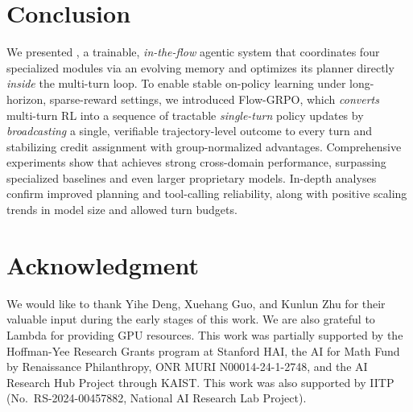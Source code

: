 \vspace{-2mm}
\section{Conclusion}
\vspace{-1mm}


We presented \model, a trainable, \emph{in-the-flow} agentic system that coordinates four specialized modules via an evolving memory and optimizes its planner directly \emph{inside} the multi-turn loop. To enable stable on-policy learning under long-horizon, sparse-reward settings, we introduced Flow-GRPO, which \emph{converts} multi-turn RL into a sequence of tractable \emph{single-turn} policy updates by \emph{broadcasting} a single, verifiable trajectory-level outcome to every turn and stabilizing credit assignment with group-normalized advantages. Comprehensive experiments show that \model achieves strong cross-domain performance, surpassing specialized baselines and even larger proprietary models. In-depth analyses confirm improved planning and tool-calling reliability, along with positive scaling trends in model size and allowed turn budgets.

\section*{Acknowledgment}
We would like to thank Yihe Deng, Xuehang Guo, and Kunlun Zhu for their valuable input during the early stages of this work. We are also grateful to Lambda for providing GPU resources. This work was partially supported by the Hoffman-Yee Research Grants program at Stanford HAI, the AI for Math Fund by Renaissance Philanthropy, ONR MURI N00014-24-1-2748, and the AI Research Hub Project through KAIST. This work was also supported by IITP (No.~RS-2024-00457882, National AI Research Lab Project).
